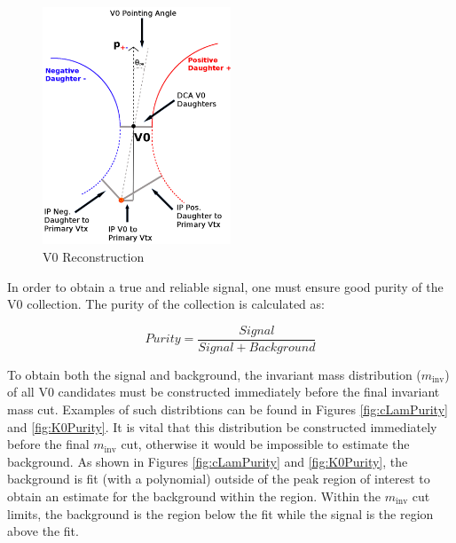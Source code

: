 \documentclass[../AnalysisNoteJBuxton.tex]{subfiles}
\begin{document}
\begin{figure}[h]
  \centering
  \includegraphics[width=0.5\textwidth]{3_DataSelection/Figures/V0CutsGeneral.pdf}
  \caption[V0 Reconstruction]{V0 Reconstruction}
  \label{fig:V0Reconstruction}
\end{figure}


In order to obtain a true and reliable signal, one must ensure good purity of the V0 collection.  The purity of the collection is calculated as:

\begin{equation}
 Purity = \frac{Signal}{Signal + Background}
\label{eqn:Purity}
\end{equation}

To obtain both the signal and background, the invariant mass distribution ($m_{\mathrm{inv}}$) of all V0 candidates must be constructed immediately before the final invariant mass cut.
Examples of such distribtions can be found in Figures \ref{fig:cLamPurity} and \ref{fig:K0Purity}.
It is vital that this distribution be constructed immediately before the final $m_{\mathrm{inv}}$ cut, otherwise it would be impossible to estimate the background.
As shown in Figures \ref{fig:cLamPurity} and \ref{fig:K0Purity}, the background is fit (with a polynomial) outside of the peak region of interest to obtain an estimate for the background within the region.
Within the $m_{\mathrm{inv}}$ cut limits, the background is the region below the fit while the signal is the region above the fit.




\end{document}
